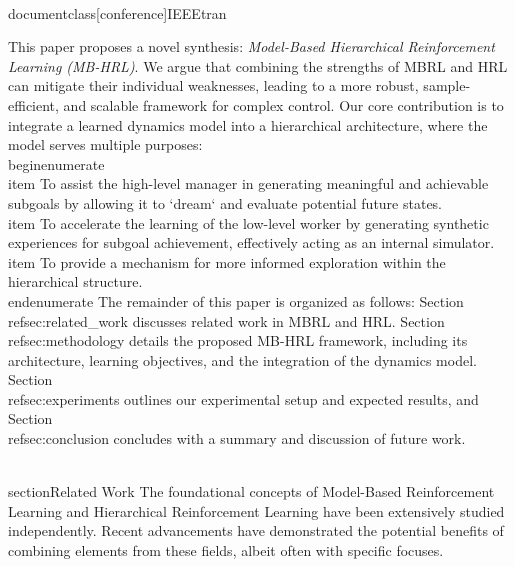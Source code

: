 \\documentclass[conference]{IEEEtran}
\begin{document}
This paper proposes a novel synthesis: \textit{Model-Based Hierarchical Reinforcement Learning (MB-HRL)}. We argue that combining the strengths of MBRL and HRL can mitigate their individual weaknesses, leading to a more robust, sample-efficient, and scalable framework for complex control. Our core contribution is to integrate a learned dynamics model into a hierarchical architecture, where the model serves multiple purposes:
\\begin{enumerate}
    \\item To assist the high-level manager in generating meaningful and achievable subgoals by allowing it to `dream` and evaluate potential future states.
    \\item To accelerate the learning of the low-level worker by generating synthetic experiences for subgoal achievement, effectively acting as an internal simulator.
    \\item To provide a mechanism for more informed exploration within the hierarchical structure.
\\end{enumerate}
The remainder of this paper is organized as follows: Section \\ref{sec:related_work} discusses related work in MBRL and HRL. Section \\ref{sec:methodology} details the proposed MB-HRL framework, including its architecture, learning objectives, and the integration of the dynamics model. Section \\ref{sec:experiments} outlines our experimental setup and expected results, and Section \\ref{sec:conclusion} concludes with a summary and discussion of future work.

\\section{Related Work}
The foundational concepts of Model-Based Reinforcement Learning and Hierarchical Reinforcement Learning have been extensively studied independently. Recent advancements have demonstrated the potential benefits of combining elements from these fields, albeit often with specific focuses.
\end{document}
